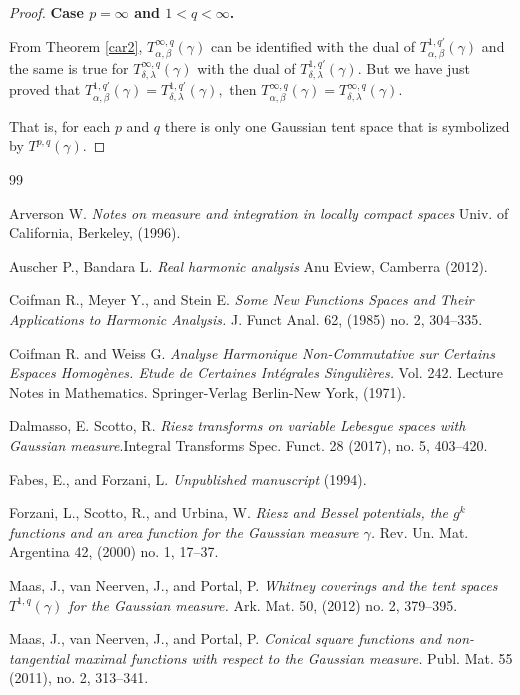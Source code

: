 \documentclass[leqno,11pt]{amsart}
\theoremstyle{plain}
\theoremstyle{remark}
\begin{document}
{\begin{proof}
{\bf Case $p=\infty$ and $1<q<\infty$.} 

From Theorem \ref{car2}, $T^{\infty, q}_{\alpha,\beta}(\gamma)$ can be identified with the dual of $T^{1,q'}_{\alpha, \beta}(\gamma)$ and the same is true for $T^{\infty, q}_{\delta, \lambda}(\gamma)$ with the dual of $T^{1,q'}_{\delta, \lambda}(\gamma).$ But we have just proved that $T^{1,q'}_{\alpha,\beta}(\gamma)=T_{\delta, \lambda}^{1, q'}(\gamma),$ then $T^{\infty, q}_{\alpha,\beta}(\gamma)=T^{\infty, q}_{\delta, \lambda}(\gamma).$


That is, for each $p$ and $q$ there is only one Gaussian tent space that is symbolized by $T^{p,q}(\gamma).$
 \end{proof}

 
 \begin{thebibliography}{99}

 Arverson W.  {\em Notes on measure and integration in locally compact spaces} Univ. of California, Berkeley, (1996).

 Auscher P., Bandara L. {\em Real harmonic analysis}
 Anu Eview, Camberra  (2012).

 Coifman R., Meyer Y., and Stein E. {\em Some New Functions Spaces and Their Applications to Harmonic Analysis.} J. Funct Anal. 62, (1985) no. 2, 304--335.

 Coifman R. and  Weiss G. {\em Analyse Harmonique Non-Commutative sur Certains Espaces Homogènes. Etude de Certaines Intégrales Singulières.}
Vol. 242. Lecture Notes in Mathematics. Springer-Verlag  Berlin-New York, (1971).

 Dalmasso, E. Scotto, R. {\em Riesz transforms on variable Lebesgue spaces with Gaussian measure}.Integral Transforms Spec. Funct. 28 (2017), no. 5, 403--420.

 Fabes, E., and Forzani, L. 
{\em Unpublished manuscript} (1994).

 Forzani, L., Scotto, R., and Urbina, W. {\em Riesz and Bessel potentials, the $g^k$ functions and an area function for the Gaussian measure $\gamma$.} Rev. Un. Mat. Argentina 42, (2000) no. 1,  17--37.

 Maas, J., van Neerven, J., and Portal, P. {\em Whitney coverings and the tent spaces $T^{1, q}(\gamma)$ for the Gaussian measure.} Ark. Mat. 50, (2012) no. 2, 379--395.

 Maas, J., van Neerven, J., and Portal, P. {\em Conical square
functions and non-tangential maximal functions with respect to the Gaussian measure.} Publ. Mat. 55 (2011), no. 2, 313--341. 


\end{thebibliography}}
\end{document}
